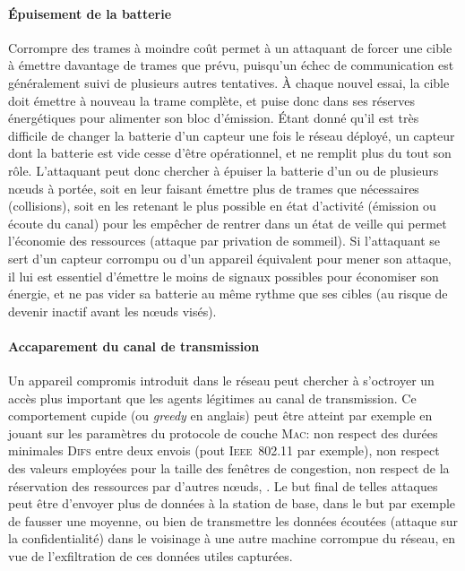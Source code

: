         \paragraph{Épuisement de la batterie}
Corrompre des trames à moindre coût permet à un attaquant de forcer une cible à émettre davantage de trames que prévu, puisqu'un échec de communication est généralement suivi de plusieurs autres tentatives.
À chaque nouvel essai, la cible doit émettre à nouveau la trame complète, et puise donc dans ses réserves énergétiques pour alimenter son bloc d'émission.
Étant donné qu'il est très difficile de changer la batterie d'un capteur une fois le réseau déployé, un capteur dont la batterie est vide cesse d'être opérationnel, et ne remplit plus du tout son rôle.
L'attaquant peut donc chercher à épuiser la batterie d'un ou de plusieurs nœuds à portée, soit en leur faisant émettre plus de trames que nécessaires (collisions), soit en les retenant le plus possible en état d'activité (émission ou écoute du canal) pour les empêcher de rentrer dans un état de veille qui permet l'économie des ressources (attaque par privation de sommeil).
Si l'attaquant se sert d'un capteur corrompu ou d'un appareil équivalent pour mener son attaque, il lui est essentiel d'émettre le moins de signaux possibles pour économiser son énergie, et ne pas vider sa batterie au même rythme que ses cibles (au risque de devenir inactif avant les nœuds visés).

        \paragraph{Accaparement du canal de transmission}
Un appareil compromis introduit dans le réseau peut chercher à s'octroyer un accès plus important que les agents légitimes au canal de transmission.
Ce comportement cupide (ou \textit{greedy} en anglais) peut être atteint par exemple en jouant sur les paramètres du protocole de couche \textsc{Mac}: non respect des durées minimales \textsc{Difs} entre deux envois (pout \textsc{Ieee~802.11} par exemple), non respect des valeurs employées pour la taille des fenêtres de congestion, non respect de la réservation des ressources par d'autres nœuds, \etc.
Le but final de telles attaques peut être d'envoyer plus de données à la station de base, dans le but par exemple de fausser une moyenne, ou bien de transmettre les données écoutées (attaque sur la confidentialité) dans le voisinage à une autre machine corrompue du réseau, en vue de l'exfiltration de ces données utiles capturées.

